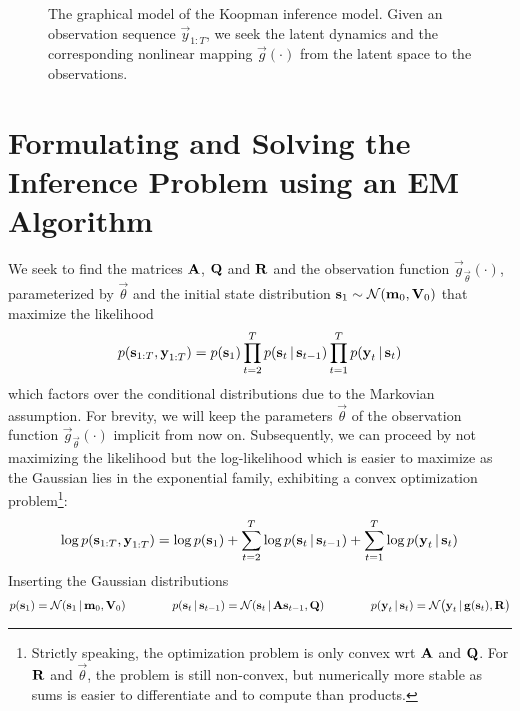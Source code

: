 \begin{figure}
	\centering
	\tikzNonlinearGaussianKoopman
	\caption{The graphical model of the Koopman inference model. Given an observation sequence \( \vec{y}_{1:T} \), we seek the latent dynamics and the corresponding nonlinear mapping \( \vec{g}(\cdot) \) from the latent space to the observations.}
	\label{fig:nonlinearGaussianKoopman}
\end{figure}

\section{Formulating and Solving the Inference Problem using an EM Algorithm}
	\label{sec:ngkDerivation}

	We seek to find the matrices \(\boldsymbol{\mathrm{A}}\), \(\boldsymbol{\mathrm{Q}}\) and \(\boldsymbol{\mathrm{R}}\) and the observation function \( \vec{g}_{\vec{\theta}}(\cdot) \), parameterized by \(\vec{\theta}\) and the initial state distribution \( \boldsymbol{\mathrm{s}}_1 \sim \mathcal{N}(\boldsymbol{\mathrm{m}}_0, \boldsymbol{\mathrm{V}}_0) \) that maximize the likelihood
	\begin{equation*}
		p(\boldsymbol{\mathrm{s}}_{1:T}, \boldsymbol{\mathrm{y}}_{1:T}) = p(\boldsymbol{\mathrm{s}}_1) \prod_{t = 2}^{T} p(\boldsymbol{\mathrm{s}}_t \,\vert\, \boldsymbol{\mathrm{s}}_{t - 1}) \prod_{t = 1}^{T} p(\boldsymbol{\mathrm{y}}_t \,\vert\, \boldsymbol{\mathrm{s}}_t)
	\end{equation*}
	which factors over the conditional distributions due to the Markovian assumption. For brevity, we will keep the parameters \( \vec{\theta} \) of the observation function \( \vec{g}_{\vec{\theta}}(\cdot) \) implicit from now on. Subsequently, we can proceed by not maximizing the likelihood but the log-likelihood which is easier to maximize as the Gaussian lies in the exponential family, exhibiting a convex optimization problem\footnote{Strictly speaking, the optimization problem is only convex \ac{wrt} \(\boldsymbol{\mathrm{A}}\) and \(\boldsymbol{\mathrm{Q}}\). For \(\boldsymbol{\mathrm{R}}\) and \(\vec{\theta}\), the problem is still non-convex, but numerically more stable as sums is easier to differentiate and to compute than products.}:
	\begin{equation*}
		\log p(\boldsymbol{\mathrm{s}}_{1:T}, \boldsymbol{\mathrm{y}}_{1:T}) = \log p(\boldsymbol{\mathrm{s}}_1) + \sum_{t = 2}^{T} \log p(\boldsymbol{\mathrm{s}}_t \,\vert\, \boldsymbol{\mathrm{s}}_{t - 1}) + \sum_{t = 1}^{T} \log p(\boldsymbol{\mathrm{y}}_t \,\vert\, \boldsymbol{\mathrm{s}}_t)
	\end{equation*}
	Inserting the Gaussian distributions
	\begin{equation*}
		p(\boldsymbol{\mathrm{s}}_1) = \mathcal{N}(\boldsymbol{\mathrm{s}}_1 \,\vert\, \boldsymbol{\mathrm{m}}_0, \boldsymbol{\mathrm{V}}_0) \qquad\qquad
		p(\boldsymbol{\mathrm{s}}_t \,\vert\, \boldsymbol{\mathrm{s}}_{t - 1}) = \mathcal{N}(\boldsymbol{\mathrm{s}}_t \,\vert\, \boldsymbol{\mathrm{A}} \boldsymbol{\mathrm{s}}_{t - 1}, \boldsymbol{\mathrm{Q}}) \qquad\qquad
		p(\boldsymbol{\mathrm{y}}_t \,\vert\, \boldsymbol{\mathrm{s}}_t) = \mathcal{N}\big(\boldsymbol{\mathrm{y}}_t \,\vert\, \boldsymbol{\mathrm{g}}(\boldsymbol{\mathrm{s}}_t), \boldsymbol{\mathrm{R}}\big)
	\end{equation*}
